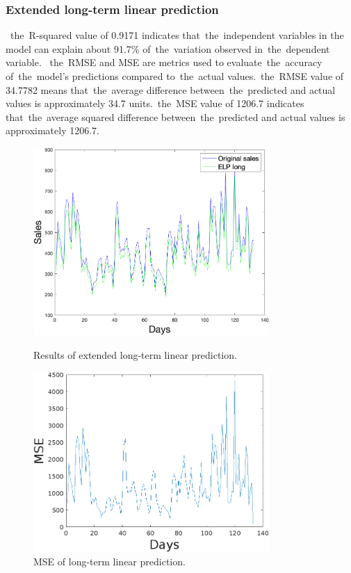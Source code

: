     \subsubsection{Extended long-term linear prediction} \label{subsec:res_eltlp}
    ~the~R-squared value of 0.9171 indicates that~the~independent variables in the
    model can explain about 91.7\% of~the~variation observed in~the~dependent variable.
    ~the~RMSE and MSE are metrics used to evaluate~the~accuracy of~the~model's predictions
    compared to~the~actual values.~the~RMSE value of 34.7782 means that~the~average difference
    between~the~predicted and actual values is approximately 34.7 units.~the~MSE value of
    1206.7 indicates that~the~average squared difference between~the~predicted and actual
    values is approximately 1206.7.\\
    \begin{figure}[h]
        \centering
        \begin{minipage}{0.49\textwidth}
            \centering
            \includegraphics[width=0.8\textwidth]{figures/expELTLP.png}
            \caption{Results of extended long-term linear prediction.}
            \label{fig:eltlpres}
        \end{minipage}\hfill
        \begin{minipage}{0.49\textwidth}
            \centering
            \includegraphics[width=0.8\textwidth]{figures/expMseELTLP.png}
            \caption{MSE of long-term linear prediction.}
            \label{fig:eltlpmse}
        \end{minipage}
    \end{figure}
